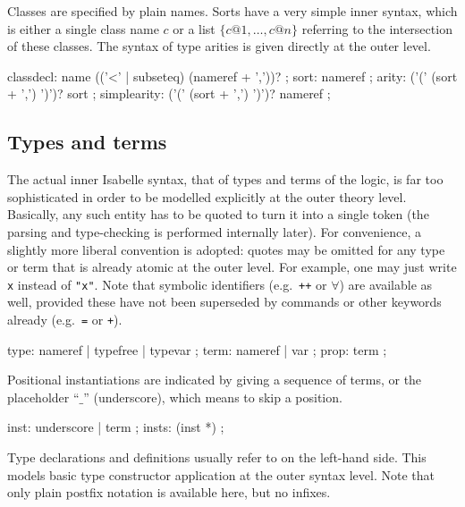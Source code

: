 Classes are specified by plain names.  Sorts have a very simple inner syntax,
which is either a single class name $c$ or a list $\{c@1, \dots, c@n\}$
referring to the intersection of these classes.  The syntax of type arities is
given directly at the outer level.


\begin{rail}
  classdecl: name (('<' | subseteq) (nameref + ','))?
  ;
  sort: nameref
  ;
  arity: ('(' (sort + ',') ')')? sort
  ;
  simplearity: ('(' (sort + ',') ')')? nameref
  ;
\end{rail}


\subsection{Types and terms}\label{sec:types-terms}

The actual inner Isabelle syntax, that of types and terms of the logic, is far
too sophisticated in order to be modelled explicitly at the outer theory
level.  Basically, any such entity has to be quoted to turn it into a single
token (the parsing and type-checking is performed internally later).  For
convenience, a slightly more liberal convention is adopted: quotes may be
omitted for any type or term that is already atomic at the outer level.  For
example, one may just write \texttt{x} instead of \texttt{"x"}.  Note that
symbolic identifiers (e.g.\ \texttt{++} or $\forall$) are available as well,
provided these have not been superseded by commands or other keywords already
(e.g.\ \texttt{=} or \texttt{+}).

\begin{rail}
  type: nameref | typefree | typevar
  ;
  term: nameref | var
  ;
  prop: term
  ;
\end{rail}

Positional instantiations are indicated by giving a sequence of terms, or the
placeholder ``$\_$'' (underscore), which means to skip a position.

\begin{rail}
  inst: underscore | term
  ;
  insts: (inst *)
  ;
\end{rail}

Type declarations and definitions usually refer to  on
the left-hand side.  This models basic type constructor application at the
outer syntax level.  Note that only plain postfix notation is available here,
but no infixes.

